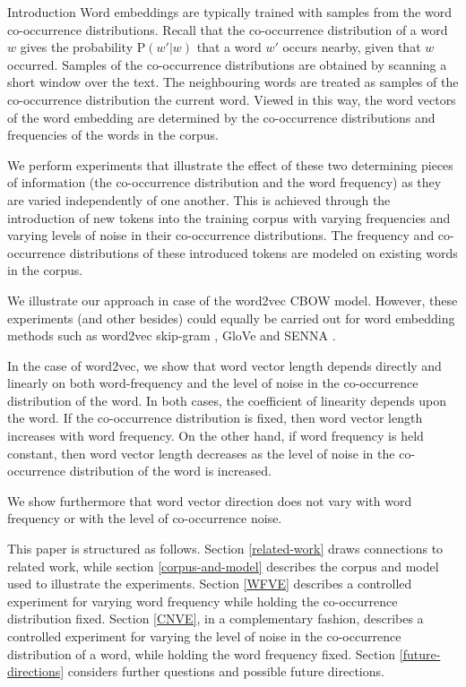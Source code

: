\documentclass{article} %
\newcommand{\p}{\text{P}}
\begin{document}
\begin{section}{Introduction}
Word embeddings are typically trained with samples from the word co-occurrence distributions.
Recall that the co-occurrence distribution of a word $w$ gives the probability $\p(w'|w)$ that a word $w'$ occurs nearby, given that $w$ occurred.
Samples of the co-occurrence distributions are obtained by scanning a short window over the text.
The neighbouring words are treated as samples of the co-occurrence distribution the current word. 
Viewed in this way, the word vectors of the word embedding are determined by the co-occurrence distributions and frequencies of the words in the corpus.

We perform experiments that illustrate the effect of these two determining pieces of information (the co-occurrence distribution and the word frequency) as they are varied independently of one another.
This is achieved through the introduction of new tokens into the training corpus with varying frequencies and varying levels of noise in their co-occurrence distributions.
The frequency and co-occurrence distributions of these introduced tokens are modeled on existing words in the corpus.

We illustrate our approach in case of the word2vec CBOW model.
However, these experiments (and other besides) could equally be carried out for word embedding methods such as word2vec skip-gram \cite{DistRepns,EfficientEstimation}, GloVe \cite{pennington2014glove} and SENNA \cite{collobert-2011}.

In the case of word2vec, we show that word vector length depends directly and linearly on both word-frequency and the level of noise in the co-occurrence distribution of the word.
In both cases, the coefficient of linearity depends upon the word.
If the co-occurrence distribution is fixed, then word vector length increases with word frequency.
On the other hand, if word frequency is held constant, then word vector length decreases as the level of noise in the co-occurrence distribution of the word is increased.

We show furthermore that word vector direction does not vary with word frequency or with the level of co-occurrence noise.

This paper is structured as follows.
Section \ref{related-work} draws connections to related work, while section \ref{corpus-and-model} describes the corpus and model used to illustrate the experiments.
Section \ref{WFVE} describes a controlled experiment for varying word frequency while holding the co-occurrence distribution fixed.
Section \ref{CNVE}, in a complementary fashion, describes a controlled experiment for varying the level of noise in the co-occurrence distribution of a word, while holding the word frequency fixed.
Section \ref{future-directions} considers further questions and possible future directions.
\end{section}
\end{document}
